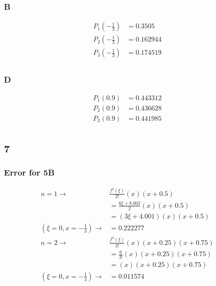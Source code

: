 \documentclass{oisinclass}
\begin{document}
\subsubsection*{B}
\begin{align*}
	P_1(-\frac{1}{3}) & = 0.3505   \\
	P_2(-\frac{1}{3}) & = 0.162944 \\
	P_3(-\frac{1}{3}) & = 0.174519 \\
\end{align*}
\subsubsection*{D}
\begin{align*}
	P_1(0.9) & = 0.443312 \\
	P_2(0.9) & = 0.436628 \\
	P_3(0.9) & = 0.441985 \\
\end{align*}

\subsection*{7}
\subsubsection*{Error for 5B}
\begin{align*}
	n = 1 \rightarrow                                  & \frac{f^2(\xi)}{2!}(x)(x+0.5)          \\
	                                                   & = \frac{6\xi + 8.002}{2}(x)(x+0.5)     \\
	                                                   & = (3\xi + 4.001)(x)(x+0.5)             \\
	\left(\xi = 0, x = -\frac{1}{3}\right) \rightarrow & =
	0.222277                                                                                    \\
	n = 2 \rightarrow                                  & \frac{f^3(\xi)}{3!}(x)(x+0.25)(x+0.75) \\
	                                                   & = \frac{6}{3!}(x)(x+0.25)(x+0.75)      \\
	                                                   & = (x)(x+0.25)(x+0.75)                  \\
	\left(\xi = 0, x = -\frac{1}{3}\right) \rightarrow & = 0.011574                             \\
\end{align*}
\end{document}
